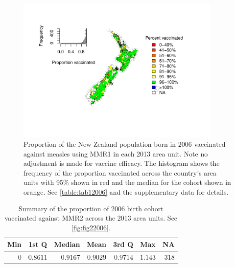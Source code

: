 \documentclass{article}
\begin{document}
\begin{figure}
   \begin{center}
    \includegraphics[width=0.9\textwidth]{nir_census_MMR1_NIR_2006.pdf}
    \end{center}
    \caption{Proportion of the New Zealand population born in 2006 vaccinated against measles using MMR1 in each 2013 area unit. Note no adjustment is made for vaccine efficacy. The histogram shows the frequency of the proportion vaccinated across the country's area units with 95\% shown in red and the median for the cohort shown in orange. See \autoref{table:tab12006} and the supplementary data for details.}
\label{fig:fig12006}
\end{figure}

 \vspace{5mm} %
\begin{table}
\begin{center}
\begin{tabular}{rrrrrrr}
\hline\hline
\multicolumn{1}{c}{Min}&\multicolumn{1}{c}{1st Q}&\multicolumn{1}{c}{Median}&\multicolumn{1}{c}{Mean}&\multicolumn{1}{c}{3rd Q}&\multicolumn{1}{c}{Max}&\multicolumn{1}{c}{NA}\tabularnewline
\hline
$0$&$0.8611$&$0.9167$&$0.9029$&$0.9714$&$1.143$&$318$\tabularnewline
\hline
\end{tabular}\end{center}\caption{Summary of the proportion of 2006 birth cohort vaccinated against MMR2 across the 2013 area units. See \autoref{fig:fig22006}.}
\label{table:tab22006}
\end{table}
\end{document}
